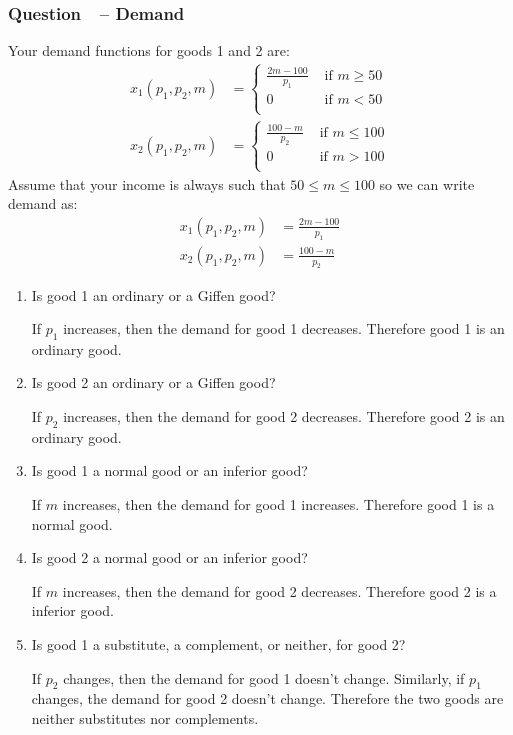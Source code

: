 \documentclass[12pt]{article}
\newcounter{question}[section]
\newcommand{\question}[1]{\refstepcounter{question}
  \subsubsection*{Question~\thequestion~-- #1}}
\newenvironment{subquestions}{
  \begin{enumerate}[label=(\roman*)]}{\end{enumerate}}
\begin{document}
\question{Demand}
Your demand functions for goods 1 and 2 are:
\begin{align*}
  x_1\left( p_1,p_2,m\right)&=
  \begin{cases}
    \frac{2m - 100}{p_1} &\text{ if } m \geq 50 \\
    0 & \text{ if } m < 50 \\
  \end{cases} \\
  x_2\left( p_1,p_2,m\right)&=
  \begin{cases}
    \frac{100 - m}{p_2} & \text{ if } m \leq 100 \\
    0 & \text{ if } m > 100 \\
  \end{cases}
\end{align*}
Assume that your income is always such that $50\leq m\leq 100$ so we can write demand as:
\begin{align*}
  x_1\left( p_1,p_2,m\right)&=\frac{2m - 100}{p_1} \\
  x_2\left( p_1,p_2,m\right)&=\frac{100 - m}{p_2}
\end{align*}
\begin{subquestions}
  \item Is good 1 an ordinary or a Giffen good?

    \textcolor{solution-color}{
      If $p_1$ increases, then the demand for good 1 decreases. Therefore good
      1 is an ordinary good.
    }
  \item Is good 2 an ordinary or a Giffen good?

    \textcolor{solution-color}{
      If $p_2$ increases, then the demand for good 2 decreases. Therefore good
      2 is an ordinary good.
    }
  \item Is good 1 a normal good or an inferior good?

    \textcolor{solution-color}{
      If $m$ increases, then the demand for good 1 increases. Therefore good
      1 is a normal good.
    }
  \item Is good 2 a normal good or an inferior good?

    \textcolor{solution-color}{
      If $m$ increases, then the demand for good 2 decreases. Therefore good
      2 is a inferior good.
    }
  \item Is good 1 a substitute, a complement, or neither,
    for good 2?

    \textcolor{solution-color}{
      If $p_2$ changes, then the demand for good 1 doesn't change. Similarly,
      if $p_1$ changes, the demand for good 2 doesn't change. Therefore the two
      goods are neither substitutes nor complements.
    }
\end{subquestions}
\end{document}
